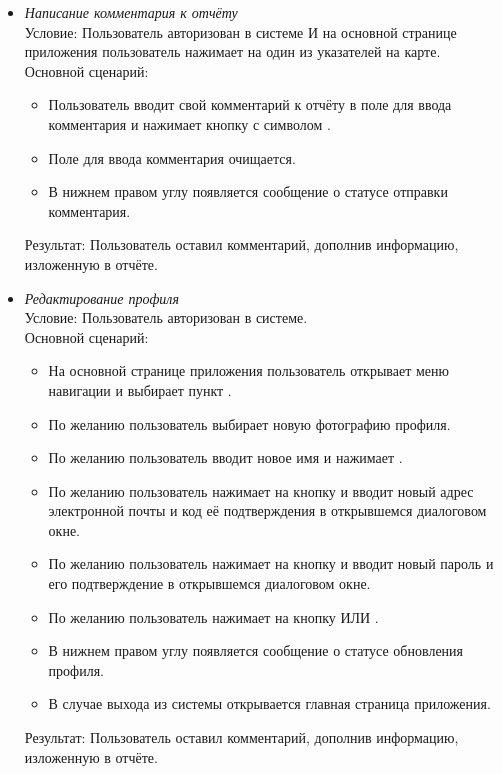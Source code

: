 \begin{itemize}[topsep=0pt, parsep=0pt, itemsep=0pt, leftmargin=*, labelindent=0.5cm]
	\item \textit{Написание комментария к отчёту} \\
	Условие: Пользователь авторизован в системе И на основной странице приложения пользователь нажимает на один из указателей на карте. \\
	Основной сценарий:
	\begin{itemize}[topsep=0pt, parsep=0pt, itemsep=0pt, leftmargin=*, labelindent=0.5cm]
		\item Пользователь вводит свой комментарий к отчёту в поле для ввода комментария и нажимает кнопку с символом \textquote{>}.
		\item Поле для ввода комментария очищается.
		\item В нижнем правом углу появляется сообщение о статусе отправки комментария.
	\end{itemize}
	Результат: Пользователь оставил комментарий, дополнив информацию, изложенную в отчёте.
	
	\item \textit{Редактирование профиля} \\
	Условие: Пользователь авторизован в системе. \\
	Основной сценарий:
	\begin{itemize}[topsep=0pt, parsep=0pt, itemsep=0pt, leftmargin=*, labelindent=0.5cm]
		\item На основной странице приложения пользователь открывает меню навигации и выбирает пункт .
		\item По желанию пользователь выбирает новую фотографию профиля.
		\item По желанию пользователь вводит новое имя и нажимает .
		\item По желанию пользователь нажимает на кнопку  и вводит новый адрес электронной почты и код её подтверждения в открывшемся диалоговом окне.
		\item По желанию пользователь нажимает на кнопку  и вводит новый пароль и его подтверждение в открывшемся диалоговом окне.
		\item По желанию пользователь нажимает на кнопку  ИЛИ .
		\item В нижнем правом углу появляется сообщение о статусе обновления профиля.
		\item В случае выхода из системы открывается главная страница приложения.
	\end{itemize}
	Результат: Пользователь оставил комментарий, дополнив информацию, изложенную в отчёте.
\end{itemize}

